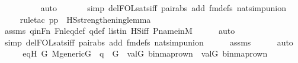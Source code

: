 \begin{isabellebody}
\ \ \ \ \ \ \ \ \isamarkupfalse%
\ auto{\isacharbrackleft}{\kern0pt}{}{\isacharbrackright}{\kern0pt}\isanewline
\ \ \ \ \ \isamarkupfalse%
\ {\isacharparenleft}{\kern0pt}simp\ del{\isacharcolon}{\kern0pt}FOL{\isacharunderscore}{\kern0pt}sats{\isacharunderscore}{\kern0pt}iff\ pair{\isacharunderscore}{\kern0pt}abs\ add{\isacharcolon}{\kern0pt}\ fm{\isacharunderscore}{\kern0pt}defs\ nat{\isacharunderscore}{\kern0pt}simp{\isacharunderscore}{\kern0pt}union{\isacharparenright}{\kern0pt}\isanewline
\ \ \ \ \isamarkupfalse%
{\isacharparenleft}{\kern0pt}rule{\isacharunderscore}{\kern0pt}tac\ p{\isacharequal}{\kern0pt}p\ \ HS{\isacharunderscore}{\kern0pt}strengthening{\isacharunderscore}{\kern0pt}lemma{\isacharparenright}{\kern0pt}\isanewline
\ \ \ \ \isamarkupfalse%
\ assms\ qinFn\ Fn{\isacharunderscore}{\kern0pt}leq{\isacharunderscore}{\kern0pt}def\ q{\isacharunderscore}{\kern0pt}def\ listin\ HS{\isacharunderscore}{\kern0pt}iff\ P{\isacharunderscore}{\kern0pt}name{\isacharunderscore}{\kern0pt}in{\isacharunderscore}{\kern0pt}M\isanewline
\ \ \ \ \isamarkupfalse%
\ auto{\isacharbrackleft}{\kern0pt}{}{\isacharbrackright}{\kern0pt}\isanewline
\ \ \ \ \ \isamarkupfalse%
\ {\isacharparenleft}{\kern0pt}simp\ del{\isacharcolon}{\kern0pt}FOL{\isacharunderscore}{\kern0pt}sats{\isacharunderscore}{\kern0pt}iff\ pair{\isacharunderscore}{\kern0pt}abs\ add{\isacharcolon}{\kern0pt}\ fm{\isacharunderscore}{\kern0pt}defs\ nat{\isacharunderscore}{\kern0pt}simp{\isacharunderscore}{\kern0pt}union{\isacharparenright}{\kern0pt}\isanewline
\ \ \ \ \isamarkupfalse%
\ assms\isanewline
\ \ \ \ \isamarkupfalse%
\ auto\isanewline
\ \ \isamarkupfalse%
\ \isamarkupfalse%
\ eqH{\isacharcolon}{\kern0pt}\ {\isachardoublequoteopen}{\isasymforall}G{\isachardot}{\kern0pt}\ M{\isacharunderscore}{\kern0pt}generic{\isacharparenleft}{\kern0pt}G{\isacharparenright}{\kern0pt}\ {\isasymand}\ q\ {\isasymin}\ G\ {\isasymlongrightarrow}\ val{\isacharparenleft}{\kern0pt}G{\isacharcomma}{\kern0pt}\ binmap{\isacharunderscore}{\kern0pt}row{\isacharprime}{\kern0pt}{\isacharparenleft}{\kern0pt}n{\isacharparenright}{\kern0pt}{\isacharparenright}{\kern0pt}\ {\isacharequal}{\kern0pt}\ val{\isacharparenleft}{\kern0pt}G{\isacharcomma}{\kern0pt}\ binmap{\isacharunderscore}{\kern0pt}row{\isacharprime}{\kern0pt}{\isacharparenleft}{\kern0pt}n{\isacharprime}{\kern0pt}{\isacharparenright}{\kern0pt}{\isacharparenright}{\kern0pt}{\isachardoublequoteclose}\isanewline

\end{isabellebody}
